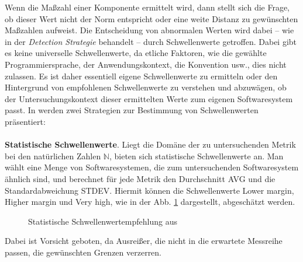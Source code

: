 \documentclass[12pt]{article}
\newcommand\Umbruch[2][3cm]{\begin{varwidth}{#1}\centering#2\end{varwidth}}
\begin{document}
Wenn die Maßzahl einer Komponente ermittelt wird, dann stellt
sich die Frage, ob dieser Wert nicht der Norm entspricht oder
eine weite Distanz zu gewünschten Maßzahlen aufweist. Die
Entscheidung von abnormalen Werten wird dabei -- wie in der
\textit{Detection Strategie} behandelt -- durch Schwellenwerte
getroffen.  Dabei gibt es keine universelle Schwellenwerte, da
etliche Faktoren, wie die gewählte Programmiersprache, der
Anwendungskontext, die Konvention usw., dies nicht zulassen.  Es
ist daher essentiell eigene Schwellenwerte zu ermitteln oder den
Hintergrund von empfohlenen Schwellenwerte zu verstehen und
abzuwägen, ob der Untersuchungskontext dieser ermittelten Werte
zum eigenen Softwaresystem passt.  In \cite{Lan07} werden zwei
Strategien zur Bestimmung von Schwellenwerten präsentiert: 
\\
\\
\textbf{Statistische Schwellenwerte}. Liegt die Domäne der zu
untersuchenden Metrik bei den natürlichen Zahlen $\mathbb{N}$,
bieten sich statistische Schwellenwerte an.  Man wählt eine Menge
von Softwaresystemen, die zum untersuchenden Softwaresystem
ähnlich sind, und berechnet für jede Metrik den
Durchschnitt AVG und die Standardabweichung STDEV. Hiermit können
die Schwellenwerte Lower margin, Higher margin und Very high, wie
in der Abb. \ref{fig:statistisch} dargestellt, abgeschätzt
werden.
		\begin{figure}
                        \centering
		\caption{Statistische Schwellenwertempfehlung aus
                        \cite{Lan07}}
                        \label{fig:statistisch}
	\end{figure}
Dabei ist Vorsicht geboten, da Ausreißer, die nicht in die
erwartete Messreihe passen, die gewünschten Grenzen verzerren.
\end{document}
